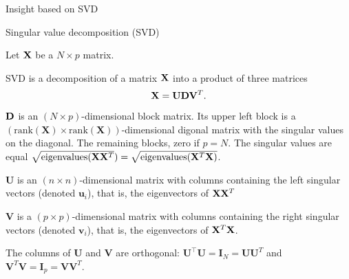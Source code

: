 \documentclass[
  ignorenonframetext,
]{beamer}
\begin{document}
\begin{frame}

\begin{block}{Insight based on SVD}

\begin{block}{Singular value decomposition (SVD)}

Let \({\bf X}\) be a \(N \times p\) matrix.

SVD is a decomposition of a matrix \({\bf X}\) into a product of three
matrices \[{\bf X}={\bf U}{\bf D}{\bf V}^T.\] \({\bf D}\) is an
\((N \times p)\)-dimensional block matrix. Its upper left block is a
\((\mbox{rank}(\mathbf{X}) \times \mbox{rank}(\mathbf{X}))\)-dimensional
digonal matrix with the singular values on the diagonal. The remaining
blocks, zero if \(p=N\). The singular values are equal
\(\sqrt{\mathrm{eigenvalues}({\bf X}{\bf X}^T})=\sqrt{\mathrm{eigenvalues}({\bf X}^T{\bf X})}\).

\(\mathbf{U}\) is an \((n \times n)\)-dimensional matrix with columns
containing the left singular vectors (denoted \(\mathbf{u}_i\)), that
is, the eigenvectors of \({\bf X}{\bf X}^T\)

\(\mathbf{V}\) is a \((p \times p)\)-dimensional matrix with columns
containing the right singular vectors (denoted \(\mathbf{v}_i\)), that
is, the eigenvectors of \({\bf X}^T{\bf X}\).

The columns of \(\mathbf{U}\) and \(\mathbf{V}\) are orthogonal:
\(\mathbf{U}^{\top} \mathbf{U} = \mathbf{I}_{N} = \mathbf{U}\mathbf{U}^T\)
and
\(\mathbf{V}^T \mathbf{V}= \mathbf{I}_{p} = \mathbf{V}\mathbf{V}^T\).

\end{block}

\end{block}

\end{frame}
\end{document}
